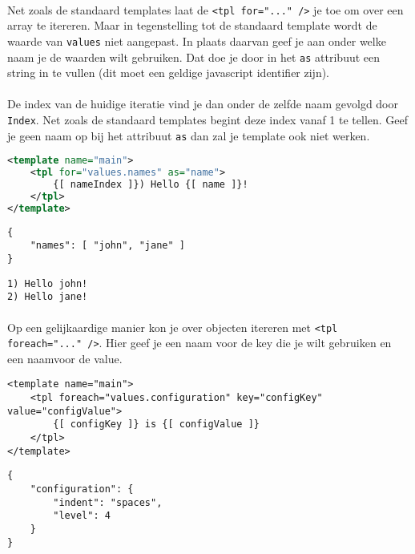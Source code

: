 \paragraph {} Net zoals de standaard templates laat de \lstinline{<tpl for="..." />} je
toe om over een array te itereren. Maar in tegenstelling tot de standaard template wordt de
waarde van \lstinline{values} niet aangepast. In plaats daarvan geef je aan onder welke
naam je de waarden wilt gebruiken. Dat doe je door in het \lstinline{as} attribuut een
string in te vullen (dit moet een geldige javascript identifier zijn).

\paragraph {} De index van de huidige iteratie vind je dan onder de zelfde naam gevolgd
door \lstinline{Index}. Net zoals de standaard templates begint deze index vanaf 1 te
tellen. Geef je geen naam op bij het attribuut \lstinline{as} dan zal je template ook niet
werken.

\begin{lstlisting}[language=xml]
<template name="main">
	<tpl for="values.names" as="name">
		{[ nameIndex ]}) Hello {[ name ]}!
	</tpl>
</template>
\end{lstlisting}

\begin{lstlisting}
{
	"names": [ "john", "jane" ]
}
\end{lstlisting}

\begin{lstlisting}
1) Hello john!
2) Hello jane!
\end{lstlisting}

\paragraph {} Op een gelijkaardige manier kon je over objecten itereren met
\lstinline{<tpl foreach="..." />}. Hier geef je een naam voor de key
die je wilt gebruiken en een naamvoor de value.

\begin{lstlisting}
<template name="main">
	<tpl foreach="values.configuration" key="configKey" value="configValue">
		{[ configKey ]} is {[ configValue ]}
	</tpl>
</template>
\end{lstlisting}

\begin{lstlisting}
{
	"configuration": {
		"indent": "spaces",
		"level": 4
	}
}
\end{lstlisting}

